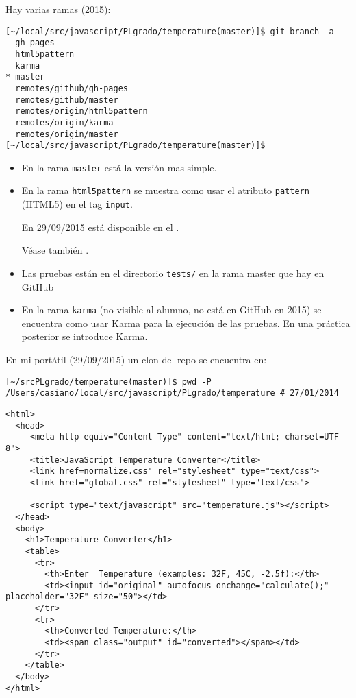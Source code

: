 Hay varias ramas (2015):

\begin{verbatim}
[~/local/src/javascript/PLgrado/temperature(master)]$ git branch -a
  gh-pages
  html5pattern
  karma
* master
  remotes/github/gh-pages
  remotes/github/master
  remotes/origin/html5pattern
  remotes/origin/karma
  remotes/origin/master
[~/local/src/javascript/PLgrado/temperature(master)]$
\end{verbatim}
\begin{itemize}
\item
En la rama \verb|master| está la versión mas simple.
\item
En la rama \verb|html5pattern| se muestra como usar el atributo \verb|pattern| (HTML5) 
en el tag \verb|input|.

En 29/09/2015 está disponible en el 
.

Véase también
.
\item
Las pruebas están en el directorio \verb|tests/| en la rama master  que hay en GitHub 
\item
En la rama \verb|karma| (no visible al alumno, no está en GitHub en 2015) se encuentra como usar Karma para la ejecución de las pruebas.
En una práctica posterior se introduce Karma.
\end{itemize}


En mi portátil (29/09/2015) un clon del repo se encuentra en:
\begin{verbatim}
[~/srcPLgrado/temperature(master)]$ pwd -P
/Users/casiano/local/src/javascript/PLgrado/temperature # 27/01/2014
\end{verbatim}


    \begin{verbatim}
<html>
  <head>
     <meta http-equiv="Content-Type" content="text/html; charset=UTF-8">
     <title>JavaScript Temperature Converter</title>
     <link href=normalize.css" rel="stylesheet" type="text/css">
     <link href="global.css" rel="stylesheet" type="text/css">

     <script type="text/javascript" src="temperature.js"></script>
  </head>
  <body>
    <h1>Temperature Converter</h1>
    <table>
      <tr>
        <th>Enter  Temperature (examples: 32F, 45C, -2.5f):</th>
        <td><input id="original" autofocus onchange="calculate();" placeholder="32F" size="50"></td>
      </tr>
      <tr>
        <th>Converted Temperature:</th>
        <td><span class="output" id="converted"></span></td>
      </tr>
    </table>
  </body>
</html>
    \end{verbatim}

